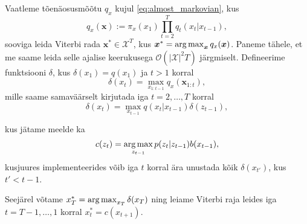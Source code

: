 Vaatleme tõenäosusmõõtu $q_x$ kujul \eqref{eq:almost_markovian}, kus
$$
q_x(\bm{x}) := \pi_x(x_1) \prod_{t=2}^T q_{t}(x_{t} | x_{t-1}),$$
sooviga leida Viterbi rada $\bm{x}^* \in \mathcal{X}^T$, kus $\bm{x}^* = \operatorname*{arg\,max}_{\bm{x}} q_x(\bm{x})$.
Paneme tähele, et me saame leida selle ajalise keerukusega $\mathcal{O} (|\mathcal{X}|^2 T)$ järgmiselt. Defineerime funktsiooni  $\delta$, kus $\delta(x_1) = q(x_1)$ ja $t > 1$ korral
$$\delta(x_t) = \max_{x_{1:t-1}} q_x(\bm{x}_{1:t}),$$
mille saame samaväärselt kirjutada
iga  $t = 2,\ldots,T$ korral 
$$\delta(x_t) = \max_{x_{t-1}} q(x_t | x_{t-1}) \delta(z_{t-1}),$$


kus jätame meelde ka
$$c(z_t) = \operatorname*{arg\,max}_{z_{t-1}} p(z_t | z_{t-1}) b(x_{t-1}),$$
kusjuures implementeerides võib iga $t$ korral ära unustada kõik $\delta(x_{t'})$, kus $t' < t - 1$.

Seejärel võtame $x_T^* = \operatorname*{arg\,max}_{x_{T}} \delta(x_T)$ ning leiame Viterbi raja leides iga $t = T-1,\ldots,1$ korral $x_t^* = c(x_{t+1})$.





